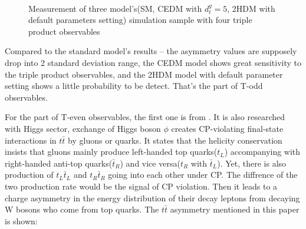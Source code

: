 			\FloatBarrier
			\begin{figure}[H]
			\centering
			    \\
			\caption{Measurement of three model's(SM, CEDM with $d_t^g=5$, 2HDM with default parameters setting) simulation sample with four triple product observables}
			\label{Obs:fig:TP_3model}
			\end{figure}
			\FloatBarrier

			Compared to the standard model's results -- the asymmetry values are supposely drop into 2 standard deviation range, the CEDM model shows great sensitivity to the triple product observables, and the 2HDM model with default parameter setting shows a little probability to be detect. That's the part of T-odd observables.

			For the part of T-even observables, the first one is from \cite{PhysRevLett.69.410}. It is also researched with Higgs sector, exchange of Higgs boson $\phi$ creates CP-violating final-state interactions in $t\bar{t}$ by gluons or quarks. It states that the helicity conservation insists that gluons mainly produce left-handed top quarks($t_L$) accompanying with right-handed anti-top quarks($\bar{t}_R$) and vice versa($t_R$ with $\bar{t}_L$). Yet, there is also production of $t_L \bar{t}_L$ and $t_R \bar{t}_R$ going into each other under CP. The diffrence of the two production rate would be the signal of CP violation. Then it leads to a charge asymmetry in the energy distribution of their decay leptons from decaying W bosons who come from top quarks. The $t\bar{t}$ asymmetry mentioned in this paper is shown:

